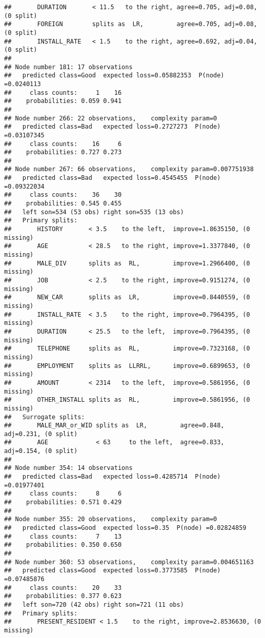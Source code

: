 \documentclass[
]{article}
\begin{document}
\begin{verbatim}
##       DURATION       < 11.5   to the right, agree=0.705, adj=0.08, (0 split)
##       FOREIGN        splits as  LR,         agree=0.705, adj=0.08, (0 split)
##       INSTALL_RATE   < 1.5    to the right, agree=0.692, adj=0.04, (0 split)
## 
## Node number 181: 17 observations
##   predicted class=Good  expected loss=0.05882353  P(node) =0.0240113
##     class counts:     1    16
##    probabilities: 0.059 0.941 
## 
## Node number 266: 22 observations,    complexity param=0
##   predicted class=Bad   expected loss=0.2727273  P(node) =0.03107345
##     class counts:    16     6
##    probabilities: 0.727 0.273 
## 
## Node number 267: 66 observations,    complexity param=0.007751938
##   predicted class=Bad   expected loss=0.4545455  P(node) =0.09322034
##     class counts:    36    30
##    probabilities: 0.545 0.455 
##   left son=534 (53 obs) right son=535 (13 obs)
##   Primary splits:
##       HISTORY       < 3.5    to the left,  improve=1.8635150, (0 missing)
##       AGE           < 28.5   to the right, improve=1.3377840, (0 missing)
##       MALE_DIV      splits as  RL,         improve=1.2966400, (0 missing)
##       JOB           < 2.5    to the right, improve=0.9151274, (0 missing)
##       NEW_CAR       splits as  LR,         improve=0.8440559, (0 missing)
##       INSTALL_RATE  < 3.5    to the right, improve=0.7964395, (0 missing)
##       DURATION      < 25.5   to the left,  improve=0.7964395, (0 missing)
##       TELEPHONE     splits as  RL,         improve=0.7323168, (0 missing)
##       EMPLOYMENT    splits as  LLRRL,      improve=0.6899653, (0 missing)
##       AMOUNT        < 2314   to the left,  improve=0.5861956, (0 missing)
##       OTHER_INSTALL splits as  RL,         improve=0.5861956, (0 missing)
##   Surrogate splits:
##       MALE_MAR_or_WID splits as  LR,         agree=0.848, adj=0.231, (0 split)
##       AGE             < 63     to the left,  agree=0.833, adj=0.154, (0 split)
## 
## Node number 354: 14 observations
##   predicted class=Bad   expected loss=0.4285714  P(node) =0.01977401
##     class counts:     8     6
##    probabilities: 0.571 0.429 
## 
## Node number 355: 20 observations,    complexity param=0
##   predicted class=Good  expected loss=0.35  P(node) =0.02824859
##     class counts:     7    13
##    probabilities: 0.350 0.650 
## 
## Node number 360: 53 observations,    complexity param=0.004651163
##   predicted class=Good  expected loss=0.3773585  P(node) =0.07485876
##     class counts:    20    33
##    probabilities: 0.377 0.623 
##   left son=720 (42 obs) right son=721 (11 obs)
##   Primary splits:
##       PRESENT_RESIDENT < 1.5    to the right, improve=2.8536630, (0 missing)

\end{verbatim}
\end{document}
